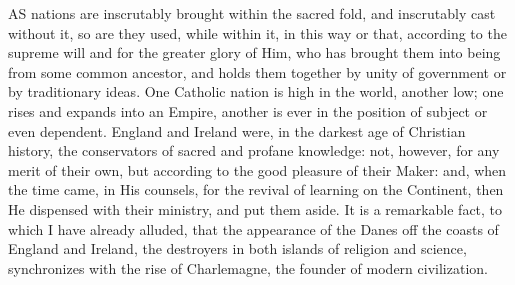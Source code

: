 
AS
nations are inscrutably brought within the sacred fold, and
inscrutably cast without it, so are they used, while within it, in
this way or that, according to the supreme will and for the greater
glory of Him, who has brought them into being from some common
ancestor, and holds them together by unity of government or by
traditionary ideas. One Catholic nation is high in the world, another
low; one rises and expands into an Empire, another is ever in the
position of subject or even dependent. England and Ireland were, in
the darkest age of Christian history, the conservators of sacred and
profane knowledge: not, however, for any merit of their own, but
according to the good pleasure of their Maker: and, when the time
came, in His counsels, for the revival of learning on the Continent,
then He dispensed with their ministry, and put them aside. It is a
remarkable fact, to which I have already alluded, that the appearance
of the Danes off the coasts of England and Ireland, the destroyers in
both islands of religion and science, synchronizes with the rise of
Charlemagne, the founder of modern civilization.

